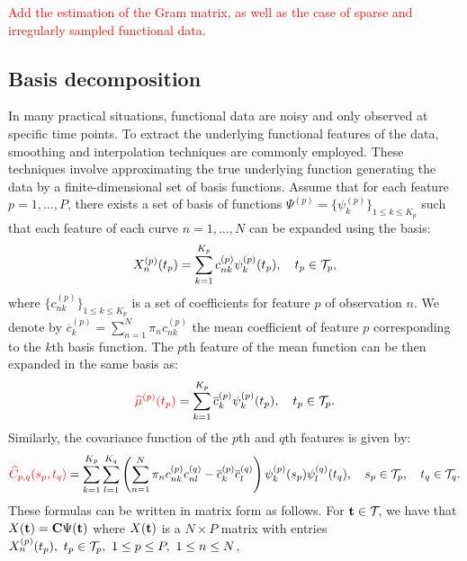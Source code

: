 \textcolor{red}{Add the estimation of the Gram matrix, as well as the case of sparse and irregularly sampled functional data.}



\subsection{Basis decomposition} %
\label{sub:basis_decomposition}


In many practical situations, functional data are noisy and only observed at specific time points. To extract the underlying functional features of the data, smoothing and interpolation techniques are commonly employed. These techniques involve approximating the true underlying function generating the data by a finite-dimensional set of basis functions. Assume that for each feature $p = 1, \dots, P$, there exists a set of basis of functions $\Psi^{(p)} = \{\psi_k^{(p)}\}_{1 \leq k \leq K_p}$ such that each feature of each curve $n = 1, \dots, N$ can be expanded using the basis:
\begin{equation}\label{eq:curve_basis_expansion}
X_n^{(p)}(t_p) = \sum_{k = 1}^{K_p} c^{(p)}_{nk}\psi_k^{(p)}(t_p), \quad t_p \in \mathcal{T}_{p},
\end{equation}
where $\{c^{(p)}_{nk}\}_{1 \leq k \leq K_p}$ is a set of coefficients for feature $p$ of observation $n$. We denote by $\overline{c}_k^{(p)} = \sum_{n = 1}^N \pi_n c^{(p)}_{nk}$ the mean coefficient of feature $p$ corresponding to the $k$th basis function.
The $p$th feature of the mean function can be then expanded in the same basis as:
\begin{equation}
    \textcolor{red}{\widehat{\mu}^{(p)}(t_p)} = \sum_{k = 1}^{K_p} \overline{c}_k^{(p)}\psi_k^{(p)}(t_p), \quad t_p \in \mathcal{T}_{p}.
\end{equation}
Similarly, the covariance function of the $p$th and $q$th features is given by:
\begin{equation}
    \textcolor{red}{\widehat{C}_{p,q}(s_p, t_q)} = \sum_{k = 1}^{K_p} \sum_{l = 1}^{K_q} \left(\sum_{n = 1}^N \pi_n c^{(p)}_{nk}c^{(q)}_{nl} - \overline{c}_k^{(p)}\overline{c}_l^{(q)}\right)\psi_k^{(p)}(s_p)\psi_l^{(q)}(t_q), \quad s_p \in \mathcal{T}_{p},\quad t_q \in \mathcal{T}_{q}.
\end{equation}
These formulas can be written in matrix form as follows. For $\mathbf{t} \in \mathcal{T}_{}$, we have that $X(\mathbf{t}) = \mathbf{C}\Psi(\mathbf{t})$ where $X(\mathbf{t})$ is a $N \times P$ matrix with entries $X_n^{(p)}(t_p),~t_p \in \mathcal{T}_{p},~1 \leq p \leq P,~1 \leq n \leq N$,
